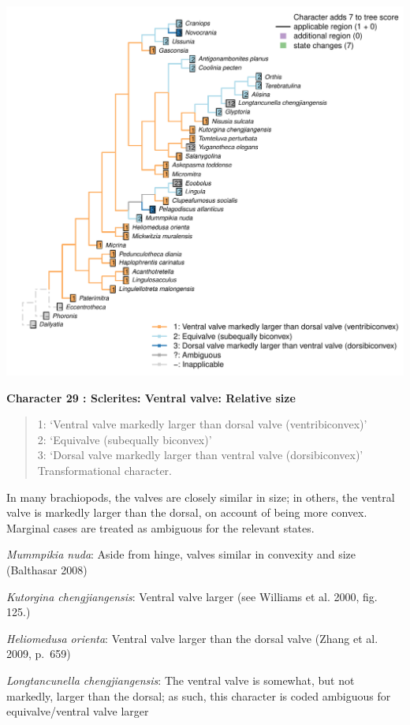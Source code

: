 \documentclass[]{book}
\theoremstyle{definition}
\theoremstyle{definition}
\theoremstyle{definition}
\theoremstyle{remark}
\begin{document}
\includegraphics{Brachiopod_phylogeny_files/figure-latex/unnamed-chunk-5-29.pdf}

\textbf{Character 29 : Sclerites: Ventral valve: Relative size }

\begin{quote}
1: `Ventral valve markedly larger than dorsal valve (ventribiconvex)'\\
2: `Equivalve (subequally biconvex)'\\
3: `Dorsal valve markedly larger than ventral valve (dorsibiconvex)'\\
Transformational character.
\end{quote}

In many brachiopods, the valves are closely similar in size; in others,
the ventral valve is markedly larger than the dorsal, on account of
being more convex. Marginal cases are treated as ambiguous for the
relevant states.

\emph{Mummpikia nuda}: Aside from hinge, valves similar in convexity and
size (Balthasar 2008)

\emph{Kutorgina chengjiangensis}: Ventral valve larger (see Williams et
al. 2000, fig. 125.)

\emph{Heliomedusa orienta}: Ventral valve larger than the dorsal valve
(Zhang et al. 2009, p.~659)

\emph{Longtancunella chengjiangensis}: The ventral valve is somewhat,
but not markedly, larger than the dorsal; as such, this character is
coded ambiguous for equivalve/ventral valve larger
\end{document}
